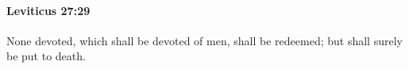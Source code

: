 
		\paragraph{Leviticus 27:29} %
			\label{LEVITICUS-27-29}

			None devoted, which shall be devoted of men, shall be redeemed; but shall surely be put to death.


